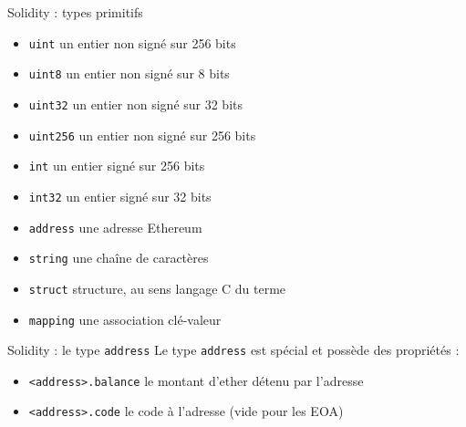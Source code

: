 \begin{frame}{Solidity : types primitifs}
  \begin{itemize}
    \item \texttt{uint} un entier non signé sur 256 bits
    \item \texttt{uint8} un entier non signé sur 8 bits
    \item \texttt{uint32} un entier non signé sur 32 bits
    \item \texttt{uint256} un entier non signé sur 256 bits
    \item \texttt{int} un entier signé sur 256 bits
    \item \texttt{int32} un entier signé sur 32 bits
    \item \texttt{address} une adresse Ethereum
    \item \texttt{string} une chaîne de caractères
    \item \texttt{struct} structure, au sens langage C du terme
    \item \texttt{mapping} une association clé-valeur
  \end{itemize}
\end{frame}

\begin{frame}[fragile]{Solidity : le type \texttt{address}}
  Le type \texttt{address} est spécial et possède des propriétés :

  \begin{itemize}
    \item \texttt{<address>.balance} le montant d'ether détenu par l'adresse
    \item \texttt{<address>.code} le code à l'adresse (vide pour les EOA)
  \end{itemize}
\end{frame}

